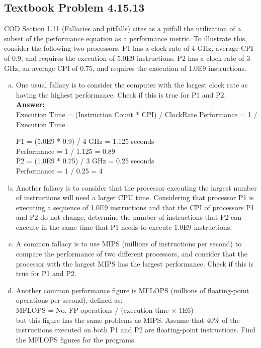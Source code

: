 \documentclass[12pt]{article}
\begin{document}
\subsection{Textbook Problem 4.15.13}
COD Section 1.11 (Fallacies and pitfalls) cites as a pitfall the utilization of a subset of the performance equation as a performance metric. To illustrate this, consider the following two processors. P1 has a clock rate of 4 GHz, average CPI of 0.9, and requires the execution of 5.0E9 instructions. P2 has a clock rate of 3 GHz, an average CPI of 0.75, and requires the execution of 1.0E9 instructions.
\begin{enumerate}[(a)]
    \item One usual fallacy is to consider the computer with the largest clock rate as having the highest performance. Check if this is true for P1 and P2.
    \\
    \textbf{Answer:}
    \\
    Execution Time = (Instruction Count * CPI) / ClockRate
    Performance = 1 / Execution Time
        \begin{center}
            P1 = (5.0E9 * 0.9) / 4 GHz = 1.125 seconds\\
            Performance = 1 / 1.125 = 0.89\\

            P2 = (1.0E9 * 0.75) / 3 GHz = 0.25 seconds\\
            Performance = 1 / 0.25 = 4\\
        \end{center}
    \item Another fallacy is to consider that the processor executing the largest number of instructions will need a larger CPU time. Considering that processor P1 is executing a sequence of 1.0E9 instructions and that the CPI of processors P1 and P2 do not change, determine the number of instructions that P2 can execute in the same time that P1 needs to execute 1.0E9 instructions.
    \item A common fallacy is to use MIPS (millions of instructions per second) to compare the performance of two different processors, and consider that the processor with the largest MIPS has the largest performance. Check if this is true for P1 and P2.
    \item  Another common performance figure is MFLOPS (millions of floating-point operations per second), defined as:\\MFLOPS = No. FP operations / (execution time × 1E6)\\but this figure has the same problems as MIPS. Assume that 40\% of the instructions executed on both P1 and P2 are floating-point instructions. Find the MFLOPS figures for the programs.

\end{enumerate}
\end{document}
